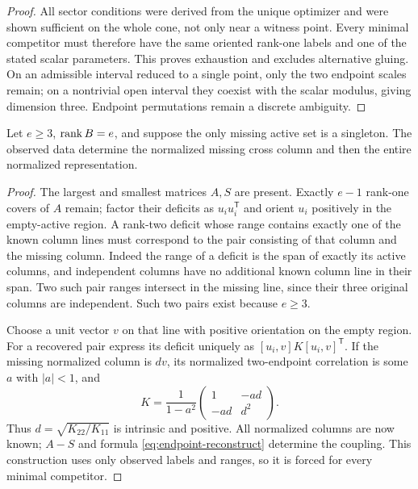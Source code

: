 \begin{proof}
All sector conditions were derived from the unique optimizer and were shown sufficient on the whole cone, not only near a witness point. Every minimal competitor must therefore have the same oriented rank-one labels and one of the stated scalar parameters. This proves exhaustion and excludes alternative gluing. On an admissible interval reduced to a single point, only the two endpoint scales remain; on a nontrivial open interval they coexist with the scalar modulus, giving dimension three. Endpoint permutations remain a discrete ambiguity.
\end{proof}

\begin{lemma}\label{lem:missing-singleton}
Let $e\ge3$, $\operatorname{rank} B=e$, and suppose the only missing active set is a singleton. The observed data determine the normalized missing cross column and then the entire normalized representation.
\end{lemma}
\begin{proof}
The largest and smallest matrices $A,S$ are present. Exactly $e-1$ rank-one covers of $A$ remain; factor their deficits as $u_iu_i^{\mathsf T}$ and orient $u_i$ positively in the empty-active region. A rank-two deficit whose range contains exactly one of the known column lines must correspond to the pair consisting of that column and the missing column. Indeed the range of a deficit is the span of exactly its active columns, and independent columns have no additional known column line in their span. Two such pair ranges intersect in the missing line, since their three original columns are independent. Such two pairs exist because $e\ge3$.

Choose a unit vector $v$ on that line with positive orientation on the empty region. For a recovered pair express its deficit uniquely as $[u_i,v]K[u_i,v]^{\mathsf T}$. If the missing normalized column is $d v$, its normalized two-endpoint correlation is some $a$ with $|a|<1$, and
\[
 K=\frac1{1-a^2}\begin{pmatrix}1&-ad\\-ad&d^2\end{pmatrix}.
\]
Thus $d=\sqrt{K_{22}/K_{11}}$ is intrinsic and positive. All normalized columns are now known; $A-S$ and formula \eqref{eq:endpoint-reconstruct} determine the coupling. This construction uses only observed labels and ranges, so it is forced for every minimal competitor.
\end{proof}

